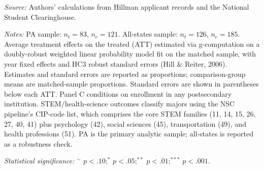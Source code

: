 \begin{table}[!h]
\begin{threeparttable}
\begin{tabular}[t]{lrrrr}
\bottomrule
\end{tabular}
\begin{tablenotes}
\item \textit{Source:} Authors' calculations from Hillman applicant records and the National Student Clearinghouse.
\item \textit{Notes:} PA sample: $n_t = 83$, $n_c = 121$. All-states sample: $n_t = 126$, $n_c = 185$. Average treatment effects on the treated (ATT) estimated via g-computation on a doubly-robust weighted linear probability model fit on the matched sample, with year fixed effects and HC3 robust standard errors (Hill \& Reiter, 2006). Estimates and standard errors are reported as proportions; comparison-group means are matched-sample proportions. Standard errors are shown in parentheses below each ATT. Panel C conditions on enrollment in any postsecondary institution. STEM/health-science outcomes classify majors using the NSC pipeline's CIP-code list, which comprises the core STEM families (11, 14, 15, 26, 27, 40, 41) plus psychology (42), social sciences (45), transportation (49), and health professions (51). PA is the primary analytic sample; all-states is reported as a robustness check.
\item \textit{Statistical significance:} $^{\sim}$ $p<.10$;\quad $^{*}$ $p<.05$;\quad $^{**}$ $p<.01$;\quad $^{***}$ $p<.001$.
\end{tablenotes}
\end{threeparttable}
\end{table}
